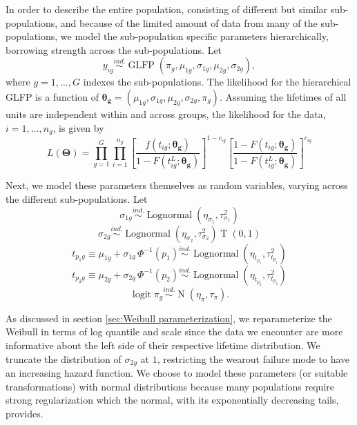 \documentclass[12pt]{article}
\newcommand{\ind}{\stackrel{ind.}{\sim}}
\newcommand{\op}{\operatorname}
\begin{document}
In order to describe the entire population, consisting of different but similar sub-populations, and because of the limited amount of data from many of the sub-populations, we model the sub-population specific parameters hierarchically, borrowing strength across the sub-populations.  Let
\begin{equation}
y_{ig} \ind \op{GLFP}\left( \pi_g, \mu_{1g}, \sigma_{1g}, \mu_{2g}, \sigma_{2g} \right),
\end{equation}
where $g=1,\ldots,G$ indexes the sub-populations.  The likelihood for the hierarchical GLFP is a function of $\bm{\theta_g} = (\mu_{1g}, \sigma_{1g}, \mu_{2g}, \sigma_{2g}, \pi_{g})$.  Assuming the lifetimes of all units are independent within and across groups, the likelihood for the data, $i=1,\dots,n_g$,  is given by
\begin{equation*}
L(\bm{\Theta})= \prod_{g=1}^{G} \prod_{i=1}^{n_{g}} \left[\frac{f(t_{ig};\bm{\theta_g})}{1-F(t_{ig}^L;\bm{\theta_g})}\right]^{1-c_{ig}} \left[ \frac{1-F(t_{ig};\bm{\theta_g})}{1-F(t_{ig}^L;\bm{\theta_g})} \right]^{c_{ig}}
\end{equation*}


Next, we model these parameters themselves as random variables, varying across the different sub-populations.  Let
\begin{equation*}
\sigma_{1g} \ind \op{Lognormal} \left( \eta_{\sigma_1}, \tau^2_{\sigma_1} \right)
\end{equation*}
\begin{equation*}
\sigma_{2g} \ind \op{Lognormal} \left( \eta_{\sigma_2}, \tau^2_{\sigma_2}\right)\op{T}\left(0, 1\right)
\end{equation*}
\begin{equation}
\label{eq:hier-model}
t_{p_{1}g} \equiv \mu_{1g} + \sigma_{1g}\,\Phi^{-1}(p_1)  \ind \op{Lognormal} \left(\eta_{t_{p_1}}, \tau^2_{t_{p_1}}\right)
\end{equation}
\begin{equation*}
t_{p_{2}g} \equiv \mu_{2g} + \sigma_{2g}\,\Phi^{-1}(p_2)  \ind \op{Lognormal} \left(\eta_{t_{p_2}}, \tau^2_{t_{p_2}}\right)
\end{equation*}
\begin{equation*}
\op{logit} \pi_g \ind \op{N}(\eta_\pi, \tau_\pi).
\end{equation*}

As discussed in section \ref{sec:Weibull parameterization}, we reparameterize the Weibull in terms of log quantile and scale since the data we encounter are more informative about the left side of their respective lifetime distribution. We truncate the distribution of $\sigma_{2g}$ at $1$, restricting the wearout failure mode to have an increasing hazard function. We choose to model these parameters (or suitable transformations) with normal distributions because many populations require strong regularization which the normal, with its exponentially decreasing tails, provides. 
\end{document}

